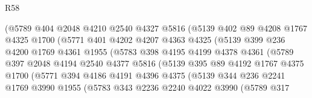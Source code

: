 \begin{lexlean}{R58}
\begin{coremodule}
                      (@5789
                        @404
                        @2048
                        @4210
                        @2540
                        @4327
                        @5816
                        (@5139
                          @402
                          @89
                          @4208
                          @1767
                          @4325
                          @1700
                          (@5771
                            @401
                            @4202
                            @4207
                            @4363
                            @4325
                            (@5139
                              @399
                              @236
                              @4200
                              @1769
                              @4361
                              @1955
                              (@5783
                                @398
                                @4195
                                @4199
                                @4378
                                @4361
                                (@5789
                                  @397
                                  @2048
                                  @4194
                                  @2540
                                  @4377
                                  @5816
                                  (@5139
                                    @395
                                    @89
                                    @4192
                                    @1767
                                    @4375
                                    @1700
                                    (@5771
                                      @394
                                      @4186
                                      @4191
                                      @4396
                                      @4375
                                      (@5139
                                        @344
                                        @236
                                        @2241
                                        @1769
                                        @3990
                                        @1955
                                        (@5783
                                          @343
                                          @2236
                                          @2240
                                          @4022
                                          @3990
                                          (@5789
                                            @317

\end{coremodule}
\end{lexlean}
